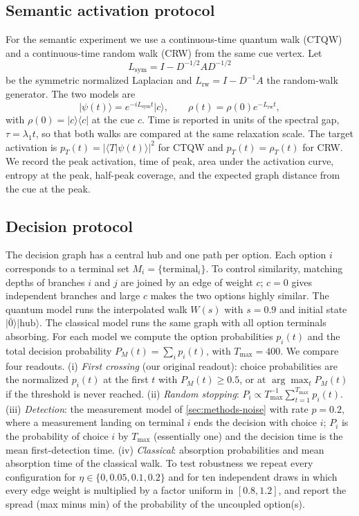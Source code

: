 \subsection{Semantic activation protocol}
\label{sec:methods-semantic}

For the semantic experiment we use a continuous-time quantum walk (CTQW) and a
continuous-time random walk (CRW) from the same cue vertex. Let
\begin{equation}
  L_{\mathrm{sym}}=I-D^{-1/2}AD^{-1/2}
\end{equation}
be the symmetric normalized Laplacian and
$L_{\mathrm{rw}}=I-D^{-1}A$ the random-walk generator. The two models are
\begin{equation}
  \lvert\psi(t)\rangle=e^{-iL_{\mathrm{sym}}t}\lvert c\rangle,
  \qquad
  \rho(t)=\rho(0)e^{-L_{\mathrm{rw}}t},
  \label{eq:ctqw-crw}
\end{equation}
with $\rho(0)=\lvert c\rangle\langle c\rvert$ at the cue $c$. Time is reported
in units of the spectral gap, $\tau=\lambda_1t$, so that both walks are
compared at the same relaxation scale. The target activation is
$p_T(t)=\lvert\langle T\vert\psi(t)\rangle\rvert^2$ for CTQW and
$p_T(t)=\rho_T(t)$ for CRW. We record the peak activation, time of peak, area
under the activation curve, entropy at the peak, half-peak coverage, and the
expected graph distance from the cue at the peak.

\subsection{Decision protocol}
\label{sec:methods-decision}

The decision graph has a central hub and one path per option. Each option
$i$ corresponds to a terminal set $M_i=\{\text{terminal}_i\}$. To control
similarity, matching depths of branches $i$ and $j$ are joined by an edge of
weight $c$; $c=0$ gives independent branches and large $c$ makes the two
options highly similar. The quantum model runs the interpolated walk $W(s)$
with $s=0.9$ and initial state $\lvert\bar 0\rangle\lvert\text{hub}\rangle$.
The classical model runs the same graph with all option terminals absorbing.
For each model we compute the option probabilities $p_i(t)$ and the total
decision probability $P_M(t)=\sum_i p_i(t)$, with $T_{\max}=400$. We compare
four readouts. (i) \emph{First crossing} (our original readout): choice
probabilities are the normalized $p_i(t)$ at the first $t$ with
$P_M(t)\ge0.5$, or at $\arg\max_tP_M(t)$ if the threshold is never reached.
(ii) \emph{Random stopping}: $P_i\propto T_{\max}^{-1}\sum_{t=1}^{T_{\max}}p_i(t)$.
(iii) \emph{Detection}: the measurement model of \cref{sec:methods-noise} with
rate $p=0.2$, where a measurement landing on terminal $i$ ends the decision
with choice $i$; $P_i$ is the probability of choice $i$ by $T_{\max}$
(essentially one) and the decision time is the mean first-detection time.
(iv) \emph{Classical}: absorption probabilities and mean absorption time of the
classical walk. To test robustness we repeat every configuration for
$\eta\in\{0,0.05,0.1,0.2\}$ and for ten independent draws in which every edge
weight is multiplied by a factor uniform in $[0.8,1.2]$, and report the spread
(max minus min) of the probability of the uncoupled option(s).

